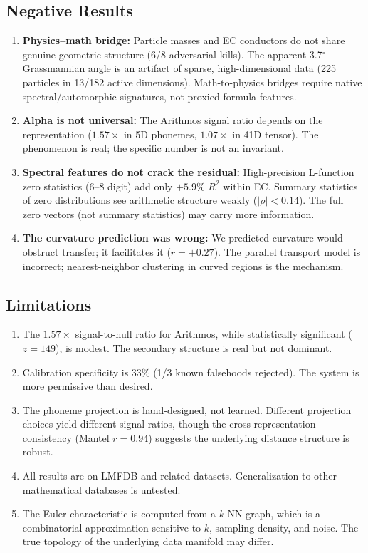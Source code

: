 \documentclass[11pt,a4paper]{article}
\begin{document}
\subsection{Negative Results}

\begin{enumerate}[nosep]
    \item \textbf{Physics--math bridge:} Particle masses and EC conductors do not share genuine geometric structure (6/8 adversarial kills). The apparent 3.7$^\circ$ Grassmannian angle is an artifact of sparse, high-dimensional data (225 particles in 13/182 active dimensions). Math-to-physics bridges require native spectral/automorphic signatures, not proxied formula features.
    \item \textbf{Alpha is not universal:} The Arithmos signal ratio depends on the representation ($1.57\times$ in 5D phonemes, $1.07\times$ in 41D tensor). The phenomenon is real; the specific number is not an invariant.
    \item \textbf{Spectral features do not crack the residual:} High-precision L-function zero statistics ($6$--$8$ digit) add only $+5.9\%$ $R^2$ within EC. Summary statistics of zero distributions see arithmetic structure weakly ($|\rho| < 0.14$). The full zero vectors (not summary statistics) may carry more information.
    \item \textbf{The curvature prediction was wrong:} We predicted curvature would obstruct transfer; it facilitates it ($r = +0.27$). The parallel transport model is incorrect; nearest-neighbor clustering in curved regions is the mechanism.
\end{enumerate}

\subsection{Limitations}

\begin{enumerate}[nosep]
    \item The $1.57\times$ signal-to-null ratio for Arithmos, while statistically significant ($z = 149$), is modest. The secondary structure is real but not dominant.
    \item Calibration specificity is 33\% (1/3 known falsehoods rejected). The system is more permissive than desired.
    \item The phoneme projection is hand-designed, not learned. Different projection choices yield different signal ratios, though the cross-representation consistency (Mantel $r = 0.94$) suggests the underlying distance structure is robust.
    \item All results are on LMFDB and related datasets. Generalization to other mathematical databases is untested.
    \item The Euler characteristic is computed from a $k$-NN graph, which is a combinatorial approximation sensitive to $k$, sampling density, and noise. The true topology of the underlying data manifold may differ.
\end{enumerate}
\end{document}
